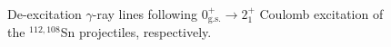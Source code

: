 \documentclass[prc,twocolumn,amssymb,amsmath,showpacs,superscriptaddress]{revtex4}
\begin{document}
\begin{figure}[htb]%
\centering
{}\\
\vspace{-0.75cm}
%
\vspace{-15pt}\caption[Coulomb excitation in
$^{112,108}$Sn]{\small De-excitation $\gamma$-ray lines following
$0_{\text{g.s.}}^+ \to 2^+_1$ Coulomb excitation of the
$^{112,108}$Sn projectiles, respectively.}%
\label{fig:Sn_peaks}%
\end{figure}
\end{document}
